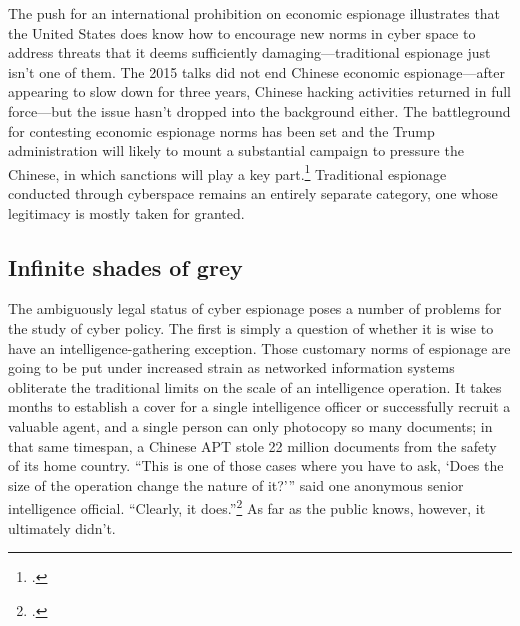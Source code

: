 \documentclass{memoir}
\begin{document}
\begin{refsegment}
The push for an international prohibition on economic espionage illustrates that the United States does know how to encourage new norms in cyber space to address threats that it deems sufficiently damaging---traditional espionage just isn't one of them.  The 2015 talks did not end Chinese economic espionage---after appearing to slow down for three years, Chinese hacking activities returned in full force---but the issue hasn't dropped into the background either. The battleground for contesting economic espionage norms has been set and the Trump administration will likely to mount a substantial campaign to pressure the Chinese, in which sanctions will play a key part.\footcite{laskai_new_2018} Traditional espionage conducted through cyberspace remains an entirely separate category, one whose legitimacy is mostly taken for granted.

\subsection{Infinite shades of grey}
The ambiguously legal status of cyber espionage poses a number of problems for the study of cyber policy. The first is simply a question of whether it is wise to have an intelligence-gathering exception. Those customary norms of espionage are going to be put under increased strain as networked information systems obliterate the traditional limits on the scale of an intelligence operation. It takes months to establish a cover for a single intelligence officer or successfully recruit a valuable agent, and a single person can only photocopy so many documents; in that same timespan, a Chinese APT stole 22 million documents from the safety of its home country. ``This is one of those cases where you have to ask, `Does the size of the operation change the nature of it?'\thinspace'' said one anonymous senior intelligence official. ``Clearly, it does.''\footcite{sanger_u.s._2015} As far as the public knows, however, it ultimately didn't.


\end{refsegment}
\end{document}

